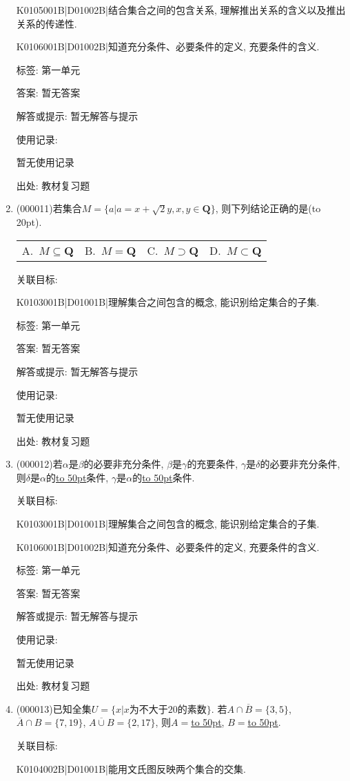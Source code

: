 \documentclass[10pt,a4paper]{article}
\newcommand{\blank}[1]{\underline{\hbox to #1pt{}}}
\newcommand{\bracket}[1]{(\hbox to #1pt{})}
\newcommand{\fourch}[4]{\par\begin{tabular}{p{.23\textwidth}p{.23\textwidth}p{.23\textwidth}p{.23\textwidth}}
A.~#1 &B.~#2& C.~#3& D.~#4
\end{tabular}}
\begin{document}
\begin{enumerate}[1.]
K0105001B|D01002B|结合集合之间的包含关系, 理解推出关系的含义以及推出关系的传递性.

K0106001B|D01002B|知道充分条件、必要条件的定义, 充要条件的含义.



标签: 第一单元

答案: 暂无答案

解答或提示: 暂无解答与提示

使用记录:

暂无使用记录


出处: 教材复习题
\item { (000011)}若集合$M=\{a|a=x+\sqrt2y, x,y\in \mathbf{Q}\}$, 则下列结论正确的是\bracket{20}.
\fourch{$M\subseteq \mathbf{Q}$}{$M=\mathbf{Q}$}{$M\supset \mathbf{Q}$}{$M\subset \mathbf{Q}$}


关联目标:

K0103001B|D01001B|理解集合之间包含的概念, 能识别给定集合的子集.



标签: 第一单元

答案: 暂无答案

解答或提示: 暂无解答与提示

使用记录:

暂无使用记录


出处: 教材复习题
\item { (000012)}若$\alpha$是$\beta$的必要非充分条件, $\beta$是$\gamma$的充要条件, $\gamma$是$\delta$的必要非充分条件, 则$\delta$是$\alpha$的\blank{50}条件, $\gamma$是$\alpha$的\blank{50}条件.


关联目标:

K0103001B|D01001B|理解集合之间包含的概念, 能识别给定集合的子集.

K0106001B|D01002B|知道充分条件、必要条件的定义, 充要条件的含义.



标签: 第一单元

答案: 暂无答案

解答或提示: 暂无解答与提示

使用记录:

暂无使用记录


出处: 教材复习题
\item { (000013)}已知全集$U=\{x|x\text{为不大于}20\text{的素数}\}$. 若$A\cap \overline{B}=\{3, 5\}$, $\overline{A}\cap B=\{7, 19\}$, $\overline{A\cup B}=\{2, 17\}$, 则$A=$\blank{50}, $B=$\blank{50}.


关联目标:

K0104002B|D01001B|能用文氏图反映两个集合的交集.


\end{enumerate}
\end{document}
